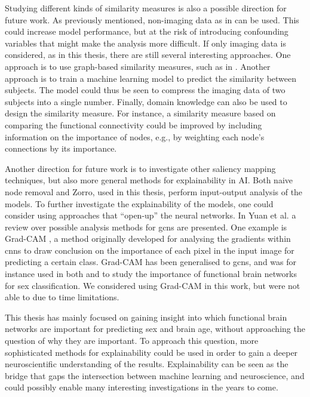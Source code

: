 Studying different kinds of similarity measures is also a possible direction for future work. As previously mentioned, non-imaging data as in \cite{stankeviciute} can be used. This could increase model performance, but at the risk of introducing confounding variables that might make the analysis more difficult. If only imaging data is considered, as in this thesis, there are still several interesting approaches. One approach is to use graph-based similarity measures, such as in \cite{higcn}. Another approach is to train a machine learning model to predict the similarity between subjects. The model could thus be seen to compress the imaging data of two subjects into a single number. Finally, domain knowledge can also be used to design the similarity measure. For instance, a similarity measure based on comparing the functional connectivity could be improved by including information on the importance of nodes, e.g., by weighting each node's connections by its importance. 

Another direction for future work is to investigate other saliency mapping techniques, but also more general methods for explainability in AI. Both naive node removal and Zorro, used in this thesis, perform input-output analysis of the models. To further investigate the explainability of the models, one could consider using approaches that ``open-up'' the neural networks. In Yuan et al. \cite{yuan_survey} a review over possible analysis methods for \acrshort{gcn}s are presented. One example is Grad-CAM \cite{gradcam}, a method originally developed for analysing the gradients within \acrshort{cnn}s to draw conclusion on the importance of each pixel in the input image for predicting a certain class. Grad-CAM has been generalised to \acrshort{gcn}s, and was for instance used in both \cite{arslan} and \cite{understanding_gnn} to study the importance of functional brain networks for sex classification. We considered using Grad-CAM in this work, but were not able to due to time limitations. 

This thesis has mainly focused on gaining insight into which functional brain networks are important for predicting sex and brain age, without approaching the question of why they are important. To approach this question, more sophisticated methods for explainability could be used in order to gain a deeper neuroscientific understanding of the results. Explainability can be seen as the bridge that gaps the intersection between machine learning and neuroscience, and could possibly enable many interesting investigations in the years to come.

